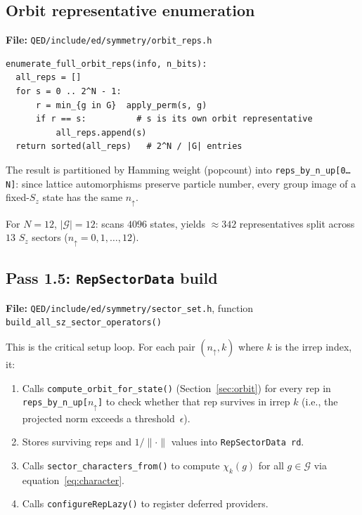 \documentclass[11pt,a4paper]{article}
\begin{document}
\subsection{Orbit representative enumeration}

\textbf{File:} \texttt{QED/include/ed/symmetry/orbit\_reps.h}

\begin{lstlisting}[style=pseudo, caption={Pseudocode for full-space orbit enumeration}]
enumerate_full_orbit_reps(info, n_bits):
  all_reps = []
  for s = 0 .. 2^N - 1:
      r = min_{g in G}  apply_perm(s, g)
      if r == s:          # s is its own orbit representative
          all_reps.append(s)
  return sorted(all_reps)   # 2^N / |G| entries
\end{lstlisting}

The result is partitioned by Hamming weight (popcount) into
\texttt{reps\_by\_n\_up[0\ldots N]}: since lattice automorphisms preserve
particle number, every group image of a fixed-$S_z$ state has the same
$n_{\uparrow}$.

For $N = 12$, $|\mathcal{G}| = 12$: scans $4096$ states, yields
$\approx 342$ representatives split across $13$ $S_z$ sectors
($n_{\uparrow} = 0, 1, \ldots, 12$).

\subsection{Pass 1.5: \texttt{RepSectorData} build}
\label{sec:pass15}

\textbf{File:} \texttt{QED/include/ed/symmetry/sector\_set.h}, function
\texttt{build\_all\_sz\_sector\_operators()}

This is the critical setup loop.  For each pair $(n_{\uparrow}, k)$ where
$k$ is the irrep index, it:
\begin{enumerate}
  \item Calls \texttt{compute\_orbit\_for\_state()} (Section~\ref{sec:orbit})
    for every rep in \texttt{reps\_by\_n\_up[$n_\uparrow$]} to check whether
    that rep survives in irrep $k$ (i.e., the projected norm exceeds a
    threshold~$\epsilon$).
  \item Stores surviving reps and $1/\|\cdot\|$ values into
    \texttt{RepSectorData rd}.
  \item Calls \texttt{sector\_characters\_from()} to compute
    $\chi_k(g)$ for all $g \in \mathcal{G}$ via equation~\eqref{eq:character}.
  \item Calls \texttt{configureRepLazy()} to register deferred providers.
\end{enumerate}
\end{document}
